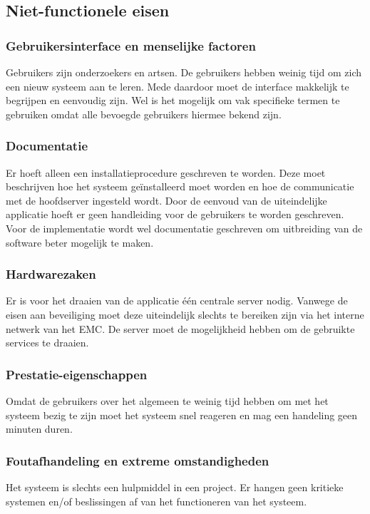 \subsection{Niet-functionele eisen}
\label{nietfunctioneleeisen}

\subsubsection{Gebruikersinterface en menselijke factoren}
Gebruikers zijn onderzoekers en artsen. 
De gebruikers hebben weinig tijd om zich een nieuw systeem aan te leren. 
Mede daardoor moet de interface makkelijk te begrijpen en eenvoudig zijn. 
Wel is het mogelijk om vak specifieke termen te gebruiken omdat alle bevoegde gebruikers hiermee bekend zijn.

\subsubsection{Documentatie}
Er hoeft alleen een installatieprocedure geschreven te worden. 
Deze moet beschrijven hoe het systeem ge\"{i}nstalleerd moet worden en hoe de communicatie met de hoofdserver ingesteld wordt. 
Door de eenvoud van de uiteindelijke applicatie hoeft er geen handleiding voor de gebruikers te worden geschreven.
Voor de implementatie wordt wel documentatie geschreven om uitbreiding van de software beter mogelijk te maken.

\subsubsection{Hardwarezaken}
Er is voor het draaien van de applicatie \'e\'en centrale server nodig.
Vanwege de eisen aan beveiliging moet deze uiteindelijk slechts te bereiken zijn via het interne netwerk van het EMC. 
De server moet de mogelijkheid hebben om de gebruikte services te draaien. 

\subsubsection{Prestatie-eigenschappen}
Omdat de gebruikers over het algemeen te weinig tijd hebben om met het systeem bezig te zijn moet het systeem snel reageren en mag een handeling geen minuten duren.

\subsubsection{Foutafhandeling en extreme omstandigheden}
Het systeem is slechts een hulpmiddel in een project. 
Er hangen geen kritieke systemen en/of beslissingen af van het functioneren van het systeem.

